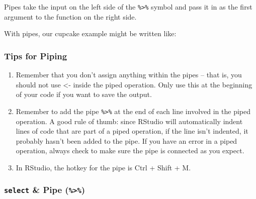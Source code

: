 \documentclass[]{book}
\newenvironment{Shaded}{\begin{snugshade}}{\end{snugshade}}
\newcommand{\KeywordTok}[1]{\textcolor[rgb]{0.13,0.29,0.53}{\textbf{#1}}}
\newcommand{\StringTok}[1]{\textcolor[rgb]{0.31,0.60,0.02}{#1}}
\newcommand{\OperatorTok}[1]{\textcolor[rgb]{0.81,0.36,0.00}{\textbf{#1}}}
\newcommand{\NormalTok}[1]{#1}
\begin{document}
Pipes take the input on the left side of the \texttt{\%\textgreater{}\%}
symbol and pass it in as the first argument to the function on the right
side.

With pipes, our cupcake example might be written like:

\begin{Shaded}
\end{Shaded}

\subsubsection*{Tips for Piping}\label{tips-for-piping}

\begin{enumerate}
\def\labelenumi{\arabic{enumi}.}
\item
  Remember that you don't assign anything within the pipes -- that is,
  you should not use \textless{}- inside the piped operation. Only use
  this at the beginning of your code if you want to save the output.
\item
  Remember to add the pipe \texttt{\%\textgreater{}\%} at the end of
  each line involved in the piped operation. A good rule of thumb: since
  RStudio will automatically indent lines of code that are part of a
  piped operation, if the line isn't indented, it probably hasn't been
  added to the pipe. If you have an error in a piped operation, always
  check to make sure the pipe is connected as you expect.
\item
  In RStudio, the hotkey for the pipe is Ctrl + Shift + M.
\end{enumerate}

\subsubsection*{\texorpdfstring{\texttt{select} \& Pipe
(\texttt{\%\textgreater{}\%})}{select \& Pipe (\%\textgreater{}\%)}}\label{select-pipe}
\end{document}
